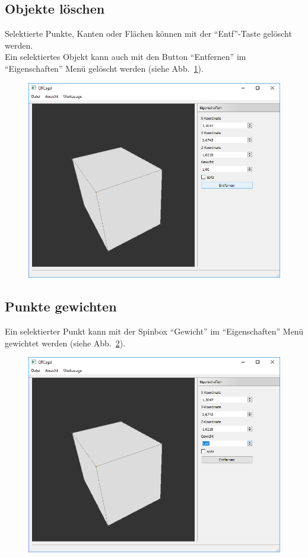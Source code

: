 \subsection{Objekte löschen}
Selektierte Punkte, Kanten oder Flächen können mit der "`Entf"'-Taste gelöscht werden.\\
Ein selektiertes Objekt kann auch mit den Button "`Entfernen"' im "`Eigenschaften"' Menü gelöscht werden (siehe Abb.~\ref{fig:PunkteLoeschen}).

\begin{figure}[H]
	\centering
	\includegraphics[scale=0.5]{content/pictures/5-PunkteLoeschen}
	\caption{}
	\label{fig:PunkteLoeschen}	
\end{figure}

\subsection{Punkte gewichten}
Ein selektierter Punkt kann mit der Spinbox "`Gewicht"' im "`Eigenschaften"' Menü gewichtet werden (siehe Abb.~\ref{fig:PunkteGewichten}).

\begin{figure}[H]
	\centering
	\includegraphics[scale=0.5]{content/pictures/6-PunkteGewichten}
	\caption{}
	\label{fig:PunkteGewichten}
\end{figure}

